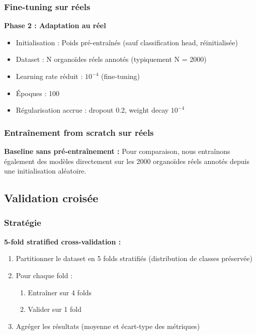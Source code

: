 \subsubsection{Fine-tuning sur réels}

\textbf{Phase 2 : Adaptation au réel}
\begin{itemize}
    \item Initialisation : Poids pré-entraînés (sauf classification head, réinitialisée)
    \item Dataset : N organoïdes réels annotés (typiquement N = 2000)
    \item Learning rate réduit : $10^{-4}$ (fine-tuning)
    \item Époques : 100
    \item Régularisation accrue : dropout 0.2, weight decay $10^{-4}$
\end{itemize}

\subsubsection{Entraînement from scratch sur réels}

\textbf{Baseline sans pré-entraînement :}
Pour comparaison, nous entraînons également des modèles directement sur les 2000 organoïdes réels annotés depuis une initialisation aléatoire.

\subsection{Validation croisée}

\subsubsection{Stratégie}

\textbf{5-fold stratified cross-validation :}
\begin{enumerate}
    \item Partitionner le dataset en 5 folds stratifiés (distribution de classes préservée)
    \item Pour chaque fold :
    \begin{enumerate}
        \item Entraîner sur 4 folds
        \item Valider sur 1 fold
    \end{enumerate}
    \item Agréger les résultats (moyenne et écart-type des métriques)
\end{enumerate}

